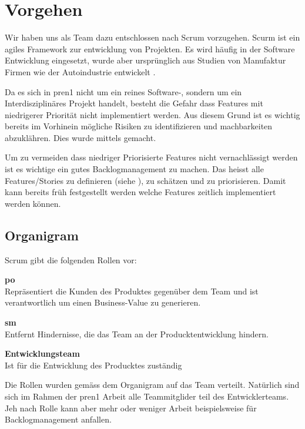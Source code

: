 \section{Vorgehen}

Wir haben uns als Team dazu entschlossen nach Scrum \cite{Wikipedia-Scrum} vorzugehen.
Scurm ist ein agiles Framework zur entwicklung von Projekten. Es wird häufig in der 
Software Entwicklung eingesetzt, wurde aber ursprünglich aus Studien von Manufaktur
Firmen wie der Autoindustrie entwickelt \cite{Wikipedia-Scrum-History}.

Da es sich in \acrshort{pren}1 nicht um ein reines Software-, sondern um
ein Interdisziplinäres Projekt handelt, besteht die Gefahr dass Features
mit niedrigerer Priorität nicht implementiert werden. Aus diesem Grund ist es
wichtig bereits im Vorhinein mögliche Risiken zu identifizieren und machbarkeiten
abzuklähren. Dies wurde mittels  gemacht.

Um zu vermeiden dass niedriger Priorisierte Features nicht vernachlässigt werden
ist es wichtige ein gutes Backlogmanagement zu machen. Das heisst alle Features/Stories
zu definieren (siehe ), zu schätzen und zu priorisieren.
Damit kann bereits früh festgestellt werden welche Features zeitlich implementiert werden 
können.

\subsection{Organigram}

Scrum gibt die folgenden Rollen vor:

\begin{items}
  \item {\bf \acrfull{po}} \\
    Repräsentiert die Kunden des Produktes gegenüber dem Team 
    und ist verantwortlich um einen Business-Value zu generieren.
  \item {\bf \acrfull{sm}} \\
    Entfernt Hindernisse, die das Team an der Producktentwicklung hindern.
  \item {\bf Entwicklungsteam} \\
    Ist für die Entwicklung des Producktes zuständig
\end{items}

Die Rollen wurden gemäss dem Organigram auf das Team verteilt. Natürlich sind 
sich im Rahmen der \acrshort{pren}1 Arbeit alle Teammitglider teil des Entwicklerteams.
Jeh nach Rolle kann aber mehr oder weniger Arbeit beispielsweise für Backlogmanagement anfallen.

